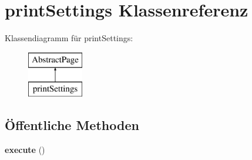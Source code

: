 \hypertarget{classprint_settings}{}\section{print\+Settings Klassenreferenz}
\label{classprint_settings}
Klassendiagramm für print\+Settings\+:\begin{figure}[H]
\begin{center}
\leavevmode
\includegraphics[height=2.000000cm]{classprint_settings}
\end{center}
\end{figure}
\subsection*{Öffentliche Methoden}
\begin{DoxyCompactItemize}
\item 
\mbox{\label{classprint_settings_ac8b62be1f813a9a6ebbd3b132d7339a3}} 
{\bfseries execute} ()
\end{DoxyCompactItemize}
